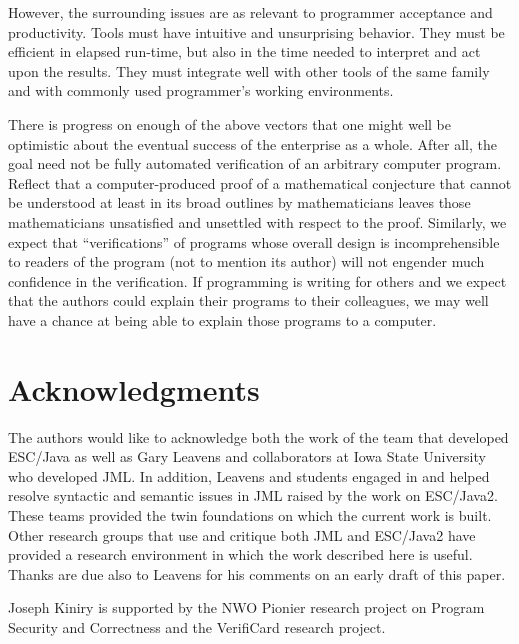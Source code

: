 \documentclass{llncs}
\begin{document}
However, the surrounding issues are as relevant to programmer
acceptance and productivity.  Tools must have intuitive and
unsurprising behavior. They must be efficient in elapsed run-time, but
also in the time needed to interpret and act upon the results.  They
must integrate well with other tools of the same family and with
commonly used programmer's working environments.


There is progress on enough of the above vectors that one might well
be optimistic about the eventual success of the enterprise as a whole.
After all, the goal need not be fully automated verification of an
arbitrary computer program.  Reflect that a computer-produced proof of
a mathematical conjecture that cannot be understood at least in its
broad outlines by mathematicians leaves those mathematicians
unsatisfied and unsettled with respect to the proof.  Similarly, we
expect that ``verifications'' of programs whose overall design is
incomprehensible to readers of the program (not to mention its author)
will not engender much confidence in the verification.  If programming is
writing for others and we expect that the authors could explain their
programs to their colleagues, we may well have a chance at being able
to explain those programs to a computer.


\section{Acknowledgments}
The authors would like to acknowledge both the work of the team that
developed ESC/Java as well as Gary Leavens and collaborators at Iowa
State University who developed JML.  In addition, Leavens and students
engaged in and helped resolve syntactic and semantic issues in JML
raised by the work on ESC/Java2.  These teams provided the twin
foundations on which the current work is built.  Other research groups
that use and critique both JML and ESC/Java2 have provided a research
environment in which the work described here is useful.  Thanks are
due also to Leavens for his comments on an early draft of this paper.

Joseph Kiniry is supported by the NWO Pionier research project on
Program Security and Correctness and the VerifiCard research project.

%


\end{document}
